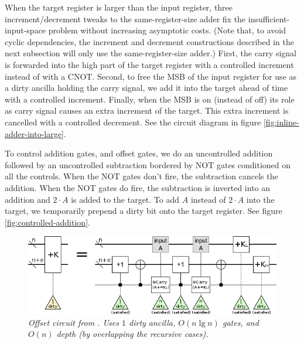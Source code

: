 \documentclass[twocolumn]{article}
\begin{document}
When the target register is larger than the input register, three increment/decrement tweaks to the same-register-size adder fix the insufficient-input-space problem without increasing asymptotic costs.
(Note that, to avoid cyclic dependencies, the increment and decrement constructions described in the next subsection will only use the same-register-size adder.)
First, the carry signal is forwarded into the high part of the target register with a controlled increment instead of with a CNOT.
Second, to free the MSB of the input register for use as a dirty ancilla holding the carry signal, we add it into the target ahead of time with a controlled increment.
Finally, when the MSB is on (instead of off) its role as carry signal causes an extra increment of the target.
This extra increment is cancelled with a controlled decrement.
See the circuit diagram in figure \ref{fig:inline-adder-into-large}.

To control addition gates, and offset gates, we do an uncontrolled addition followed by an uncontrolled subtraction bordered by NOT gates conditioned on all the controls.
When the NOT gates don't fire, the subtraction cancels the addition.
When the NOT gates do fire, the subtraction is inverted into an addition and $2 \cdot A$ is added to the target.
To add $A$ instead of $2 \cdot A$ into the target, we temporarily prepend a dirty bit onto the target register.
See figure \ref{fig:controlled-addition}.

\begin{figure}
  \centering
  \includegraphics[width=\linewidth]{assets/offset.png}
  \caption{\em
      Offset circuit from \cite{haner2016}.
      Uses $1$ dirty ancilla, $O(n \lg n)$ gates, and $O(n)$ depth (by overlapping the recursive cases).
  }
  \label{fig:offset}
\end{figure}
\end{document}

